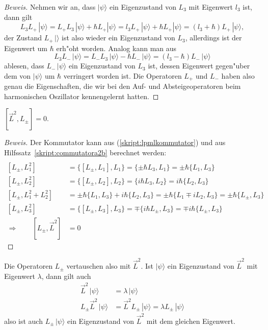 \begin{proof}[Beweis]
Nehmen wir an, dass $|\psi\rangle$ ein Eigenzustand von $L_3$ mit
Eigenwert $l_3$ ist, dann gilt
\[
L_3L_+\,|\psi\rangle
=
L_+L_3\,|\psi\rangle+\hbar L_+|\psi\rangle
=
l_3L_+\,|\psi\rangle+\hbar L_+|\psi\rangle
=
(l_3+\hbar)L_+\,|\psi\rangle,
\]
der Zustand $L_+\,|\rangle$ ist also wieder ein Eigenzustand von $L_3$,
allerdings ist der Eigenwert um $\hbar$ erh"oht worden.
Analog kann man aus
\[
L_3L_-\,|\psi\rangle
=
L_-L_3\,|\psi\rangle-\hbar L_-\,|\psi\rangle
=
(l_3-\hbar)L_-\,|\psi\rangle
\]
ablesen,  dass $L_-\,|\psi\rangle$ ein Eigenzustand von $L_3$ ist, dessen
Eigenwert gegen"uber dem von $|\psi\rangle$ um $\hbar$ verringert
worden ist.
Die Operatoren $L_+$ und $L_-$ haben also genau die Eigenschaften,
die wir bei den Auf- und Absteigeoperatoren beim harmonischen Oszillator
kennengelernt hatten.
\end{proof}

\begin{hilfssatz}
$[\vec L^2,L_\pm]=0.$
\end{hilfssatz}

\begin{proof}[Beweis]
Der Kommutator kann
aus (\ref{skript:lpmlkommutator}) und aus
Hilfssatz~\ref{skript:commutatora2b} berechnet werden:
\begin{align*}
\\
[L_\pm,L_1^2]
&=
\{ [L_\pm, L_1], L_1 \}
=
\{ \pm \hbar L_3, L_1 \}
=
\pm \hbar \{ L_1, L_3 \}
\\
[L_\pm,L_2^2]
&=
\{ [L_\pm, L_2], L_2 \}
=
\{ i\hbar L_3, L_2 \}
=
i\hbar \{ L_2, L_3 \}
\\
[L_\pm,L_1^2 + L_2^2]
&=
\pm \hbar \{ L_1, L_3 \}
+
i\hbar \{ L_2, L_3 \}
=
\pm \hbar \{ L_1 \mp iL_2, L_3 \}
=
\pm \hbar\{L_\pm, L_3\}
\\
[L_\pm,L_3^2]
&=
\{ [L_\pm, L_3], L_3 \}
=
\mp \{ i\hbar L_\pm, L_3 \}
=
\mp i\hbar \{ L_\pm, L_3 \}
\\
\Rightarrow\qquad [L_\pm,\vec L^2]
&=0
\end{align*}
\end{proof}

Die Operatoren $L_\pm$ vertauschen also mit $\vec L^2$.
Ist $|\psi\rangle$ ein Eigenzustand von $\vec L^2$ mit Eigenwert $\lambda$,
dann gilt auch 
\begin{align*}
\vec L^2\,|\psi\rangle&=\lambda\,|\psi\rangle
\\
L_\pm\vec L^2\,|\psi\rangle&=
\vec L^2L_\pm\,|\psi\rangle=
\lambda L_\pm\,|\psi\rangle
\end{align*}
also ist  auch $L_\pm\,|\psi\rangle$ ein Eigenzustand von $\vec L^2$ mit
dem gleichen Eigenwert.

